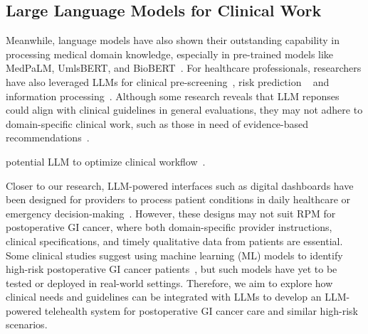 \subsection{Large Language Models for Clinical Work}
Meanwhile, language models have also shown their outstanding capability in processing medical domain knowledge, especially in pre-trained models like MedPaLM\cite{singhalLargeLanguageModels2023}, UmlsBERT\cite{michalopoulosUmlsBERTClinicalDomain2021}, and BioBERT~\cite{leeBioBERTPretrainedBiomedical2019}. For healthcare professionals, researchers have also leveraged LLMs for clinical pre-screening~\cite{hamer_improving_2023, wang_brilliant_2021}, risk prediction ~\cite{o2015risk,gatt2022review, kennedy2014delirium, beede2020human} and information processing~\cite{kocaballi_envisioning_2020, nair_generating_2023,  cascella2023evaluating, nori2023capabilities, agrawal_large_2022, arbatti_what_2023}. 
Although some research reveals that LLM reponses could align with clinical guidelines in general evaluations, they may not adhere to domain-specific clinical work, such as those in need of evidence-based recommendations~\cite{nwachukwu2024currently}.

potential LLM to optimize clinical workflow~\cite{tripathi2024efficient}.

Closer to our research, LLM-powered interfaces such as digital dashboards have been designed for providers to process patient conditions in daily healthcare or emergency decision-making~\cite{yangWishThereWere2024, zhangRethinkingHumanAICollaboration2024}. However, these designs may not suit RPM for postoperative GI cancer, where both domain-specific provider instructions, clinical specifications, and timely qualitative data from patients are essential. Some clinical studies suggest using machine learning (ML) models to identify high-risk postoperative GI cancer patients~\cite{vankootenPreoperativeRiskFactors2021, chenDevelopmentValidationMachine2022a}, but such models have yet to be tested or deployed in real-world settings. Therefore, we aim to explore how clinical needs and guidelines can be integrated with LLMs to develop an LLM-powered telehealth system for postoperative GI cancer care and similar high-risk scenarios.
